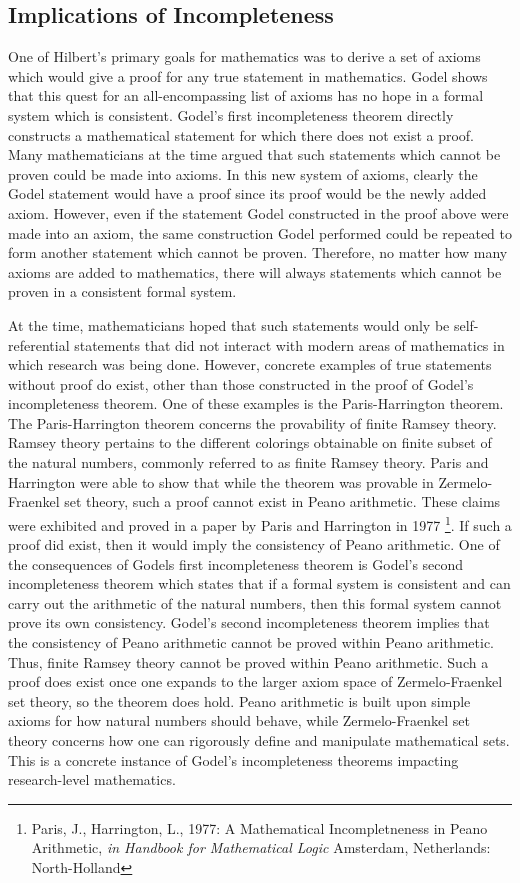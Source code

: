 \documentclass[%
 reprint,
 amsmath,amssymb,
 aps,
]{revtex4-2}
\begin{document}
\subsection{Implications of Incompleteness}

One of Hilbert's primary goals for mathematics was to derive a set of axioms which would give a proof for any true statement in mathematics.  Godel shows that this quest for an all-encompassing list of axioms has no hope in a formal system which is consistent.  Godel's first incompleteness theorem directly constructs a mathematical statement for which there does not exist a proof.  Many mathematicians at the time argued that such statements which cannot be proven could be made into axioms.  In this new system of axioms, clearly the Godel statement would have a proof since its proof would be the newly added axiom.  However, even if the statement Godel constructed in the proof above were made into an axiom, the same construction Godel performed could be repeated to form another statement which cannot be proven.  Therefore, no matter how many axioms are added to mathematics, there will always statements which cannot be proven in a consistent formal system.   

At the time, mathematicians hoped that such statements would only be self-referential statements that did not interact with modern areas of mathematics in which research was being done. However, concrete examples of true statements without proof do exist, other than those constructed in the proof of Godel's incompleteness theorem.  One of these examples is the Paris-Harrington theorem.  The Paris-Harrington theorem concerns the provability of finite Ramsey theory.  Ramsey theory pertains to the different colorings obtainable on finite subset of the natural numbers, commonly referred to as finite Ramsey theory.  Paris and Harrington were able to show that while the theorem was provable in Zermelo-Fraenkel set theory, such a proof cannot exist in Peano arithmetic.  These claims were exhibited and proved in a paper by Paris and Harrington in 1977 \footnote{Paris, J., Harrington, L., 1977: A Mathematical Incompletneness in Peano Arithmetic, \textit{in Handbook for Mathematical Logic} Amsterdam, Netherlands: North-Holland}.  If such a proof did exist, then it would imply the consistency of Peano arithmetic.  One of the consequences of Godels first incompleteness theorem is Godel's second incompleteness theorem which states that
if a formal system is consistent and can carry out the arithmetic of the natural numbers, then this formal system cannot prove its own consistency.
Godel's second incompleteness theorem implies that the consistency of Peano arithmetic cannot be proved within Peano arithmetic.  Thus, finite Ramsey theory cannot be proved within Peano arithmetic.  Such a proof does exist once one expands to the larger axiom space of Zermelo-Fraenkel set theory, so the theorem does hold.  Peano arithmetic is built upon simple axioms for how natural numbers should behave, while Zermelo-Fraenkel set theory concerns how one can rigorously define and manipulate mathematical sets.  This is a concrete instance of Godel's incompleteness theorems impacting research-level mathematics.  
\end{document}
